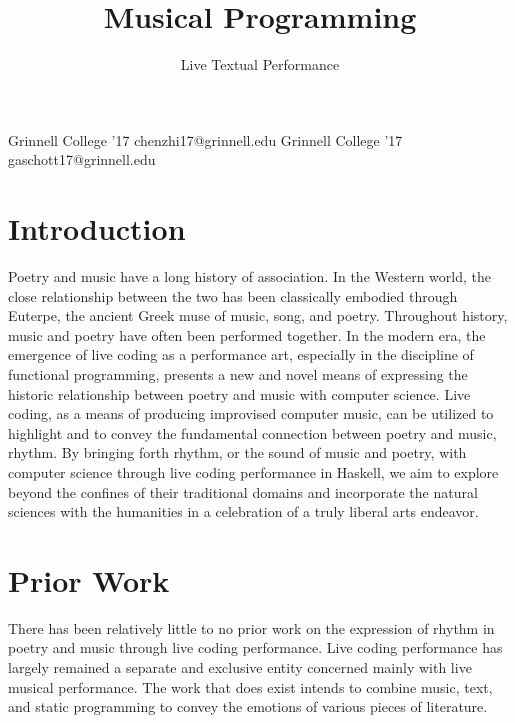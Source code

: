 \documentclass[11pt]{sigplanconf}
\begin{document}
\setlength{\pdfpageheight}{\paperheight}
\setlength{\pdfpagewidth}{\paperwidth}


\title{Musical Programming}
\subtitle{Live Textual Performance}

           {Grinnell College '17}
           {chenzhi17@grinnell.edu}
           {Grinnell College '17}
           {gaschott17@grinnell.edu}

\maketitle

\section{Introduction}

Poetry and music have a long history of association. In the Western world, the close relationship between the two has been classically embodied through Euterpe, the ancient Greek muse of music, song, and poetry. Throughout history, music and poetry have often been performed together. In the modern era, the emergence of live coding as a performance art, especially in the discipline of functional programming, presents a new and novel means of expressing the historic relationship between poetry and music with computer science. Live coding, as a means of producing improvised computer music, can be utilized to highlight and to convey the fundamental connection between poetry and music, rhythm. By bringing forth rhythm, or the sound of music and poetry, with computer science through live coding performance in Haskell, we aim to explore beyond the confines of their traditional domains and incorporate the natural sciences with the humanities in a celebration of a truly liberal arts endeavor.

\section{Prior Work}

There has been relatively little to no prior work on the expression of rhythm in poetry and music through live coding performance. Live coding performance has largely remained a separate and exclusive entity concerned mainly with live musical performance. The work that does exist intends to combine music, text, and static programming to convey the emotions of various pieces of literature.\\
\end{document}
